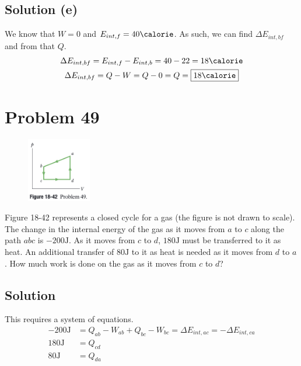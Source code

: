\documentclass[12pt]{article}
\begin{document}
        \subsection{Solution (e)}
            We know that $W = 0$ and $E_{int,f} = 40 \unit{\calorie}$.
            As such, we can find $\Delta E_{int,bf}$ and from that $Q$.
            \begin{gather}
                \Delta E_{int,bf} = E_{int,f} - E_{int,b} = 40 - 22 = 18 \unit{\calorie}\\
                \Delta E_{int,bf} = Q - W = Q - 0 = Q = \boxed{18 \unit{\calorie}}
            \end{gather}


    \pagebreak
    \section{Problem 49}
        \begin{figure}
            \vspace{-30pt}
            \includegraphics[width=0.25\textwidth]{picture_18-42.png} 
        \end{figure}
        Figure 18-42 represents a closed cycle for a gas (the figure is not drawn to scale). 
        The change in the internal energy of the gas as it moves from $a$ to $c$ along the path $abc$ is $-200 \unit{\joule}$.
        As it moves from $c$ to $d$, $180 \unit{\joule}$ must be transferred to it as heat. 
        An additional transfer of $80 \unit{\joule}$ to it as heat is needed as it moves from $d$ to $a$. 
        How much work is done on the gas as it moves from $c$ to $d$?

        \subsection{Solution}
            This requires a system of equations.
            \begin{align}
                -200\unit{\joule}   &=  Q_{ab} - W_{ab} + Q_{bc} - W_{bc} = \Delta E_{int,ac} = -\Delta E_{int,ca}\\
                180 \unit{\joule}   &=  Q_{cd}\\
                80 \unit{\joule}    &=  Q_{da}
            \end{align}
\end{document}
